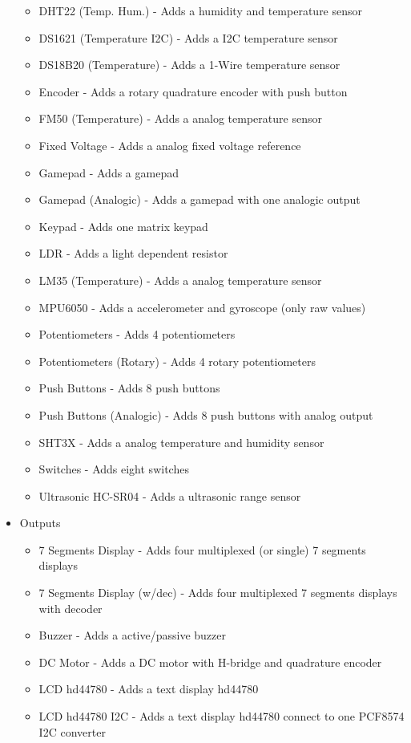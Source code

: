 \begin{itemize}
\begin{itemize}
  \item DHT22 (Temp. Hum.) - Adds a humidity and temperature sensor
  \item DS1621 (Temperature I2C) -  Adds a I2C temperature sensor 
  \item DS18B20 (Temperature) - Adds a 1-Wire temperature sensor 
  \item Encoder - Adds a rotary quadrature encoder with push button
  \item FM50 (Temperature) - Adds a analog temperature sensor
  \item Fixed Voltage -  Adds a analog fixed voltage reference
  \item Gamepad - Adds a gamepad
  \item Gamepad (Analogic) - Adds a gamepad with one analogic output 
  \item Keypad -  Adds one matrix keypad
  \item LDR - Adds a light dependent resistor 
  \item LM35 (Temperature) - Adds a analog temperature sensor
  \item MPU6050 - Adds a accelerometer and gyroscope (only raw values)
  \item Potentiometers - Adds 4 potentiometers
  \item Potentiometers (Rotary) - Adds 4 rotary potentiometers
  \item Push Buttons - Adds 8 push buttons
  \item Push Buttons (Analogic) - Adds 8 push buttons with analog output
  \item SHT3X - Adds a analog temperature and humidity sensor
  \item Switches - Adds eight switches
  \item Ultrasonic HC-SR04 - Adds a ultrasonic range sensor
\end{itemize}
 \item{Outputs}
  \begin{itemize}
   \item 7 Segments Display -  Adds four multiplexed (or single) 7 segments displays
   \item 7 Segments Display (w/dec) -  Adds four multiplexed 7 segments displays with decoder
   \item Buzzer - Adds a active/passive buzzer
   \item DC Motor - Adds a DC motor with H-bridge and quadrature encoder 
   \item LCD hd44780 - Adds a text display hd44780
   \item LCD hd44780 I2C - Adds a text display hd44780 connect to one PCF8574 I2C converter

\end{itemize}
\end{itemize}
